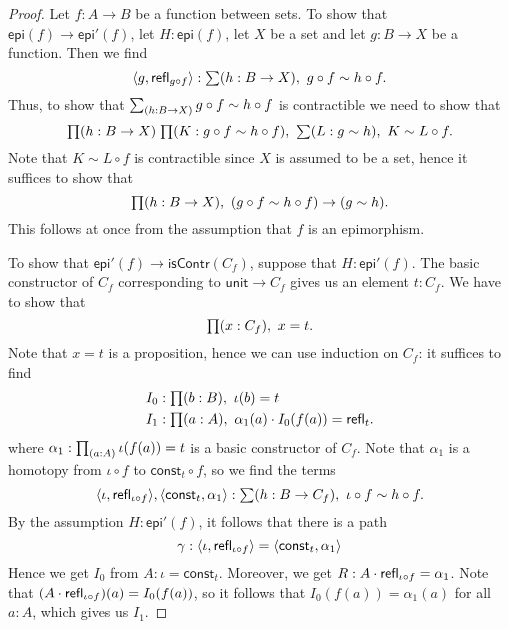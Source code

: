 \begin{proof}
Let $f:A\to B$ be a function between sets.
To show that $\mathsf{epi}(f)\to\mathsf{epi}'(f)$, let $H:\mathsf{epi}(f)$,
let $X$ be a set and let $g:B\to X$ be a function. Then we find
\begin{equation*}
\pairr{g,\refl{g\circ f}}:\sm{h:B\to X} g\circ f\sim h\circ f.
\end{equation*}
Thus, to show that $\sm{h:B\to X} g\circ f\sim h\circ f$ 
is contractible we need to show that
\begin{equation*}
\prd{h:B\to X}{K:g\circ f\sim h\circ f}\sm{L:g\sim h} K\sim L\circ f.
\end{equation*}
Note that $K\sim L\circ f$ is contractible since $X$ is assumed to be a set,
hence it suffices to show that
\begin{equation*}
\prd{h:B\to X} (g\circ f\sim h\circ f)\to (g\sim h).
\end{equation*}
This follows at once from the assumption that $f$ is an epimorphism.

To show that $\mathsf{epi}'(f)\to\mathsf{isContr}(C_f)$, suppose that
$H:\mathsf{epi}'(f)$. The basic constructor of $C_f$ corresponding to
$\mathsf{unit}\to C_f$ gives us an element $t:C_f$. We have to show that
\begin{equation*}
\prd{x:C_f} x= t.
\end{equation*}
Note that $x= t$ is a proposition, hence we can use induction on
$C_f$: it suffices to find
\begin{align*}
I_0 & : \prd{b:B} \iota(b)= t\\
I_1 & : \prd{a:A} \alpha_1(a)\cdot I_0(f(a))=\refl{t}.
\end{align*}
where $\alpha_1:\prd{a:A} \iota(f(a))= t$ is a basic constructor
of $C_f$. Note that $\alpha_1$ is a homotopy from $\iota\circ f$ to
$\mathsf{const}_t\circ f$, so we find the terms
\begin{equation*}
\pairr{\iota,\refl{\iota\circ f}},\pairr{\mathsf{const}_t,\alpha_1}:
\sm{h:B\to C_f} \iota\circ f\sim h\circ f.
\end{equation*}
By the assumption $H:\mathsf{epi}'(f)$, it follows that there is a path
\begin{equation*}
\gamma:{\langle \iota,\mathsf{refl}_{\iota\circ f}\rangle}={\langle \mathsf{const}_t,\alpha_1\rangle}
\end{equation*}
Hence we get $I_0$ from $A:\iota=\mathsf{const}_t$. Moreover,
we get $ R:A\cdot\mathsf{refl}_{\iota\circ f}=\alpha_1$.
Note that $(A\cdot\mathsf{refl}_{\iota\circ f})(a)= I_0(f(a))$, so it follows
that $I_0(f(a))= \alpha_1(a)$ for all $a:A$, which gives us $I_1$.


\end{proof}
